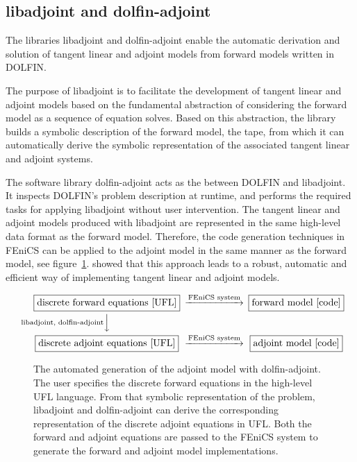\documentclass[prodmode,acmtoms]{acmsmall}
\newcommand{\fenics}{{\mbox{FEniCS}}\xspace}
\newcommand{\dolfin}{{\mbox{DOLFIN}}\xspace}
\newcommand{\da}{\mbox{{dolfin-adjoint}}\xspace}
\newcommand{\libadjoint}{\mbox{{libadjoint}}\xspace}
\begin{document}
\subsection{\libadjoint and \da}
The libraries \libadjoint and \da enable the automatic derivation and solution of tangent linear and adjoint models from forward models written in \dolfin.

The purpose of \libadjoint is to facilitate the development of tangent linear and adjoint models based on the fundamental abstraction of considering the forward model as a sequence of equation solves. 
Based on this abstraction, the library builds a symbolic description of the forward model, the tape, from which it can automatically derive the symbolic representation of the associated tangent linear and adjoint systems. 

The software library \da acts as the between \dolfin and \libadjoint. 
It inspects \dolfin's problem description at runtime, and performs the required tasks for applying \libadjoint without user intervention. 
The tangent linear and adjoint models produced with \libadjoint are represented in the same high-level data format as the forward model. 
Therefore, the code generation techniques in \fenics can be applied to the adjoint model in the same manner as the forward model, see figure~\ref{fig:our_approach}. 
 showed that this approach leads to a robust, automatic and efficient way of implementing tangent linear and adjoint models.  

\begin{figure}
\begin{equation*}
  \begin{CD}
    \fbox{\textrm{discrete forward equations [UFL]}}
    @>\textrm{\fenics system}>>
    \fbox{\textrm{forward model [code]}}\\
    @V\textrm{\libadjoint, \da}VV
    \\
    \fbox{\textrm{discrete adjoint equations [UFL]}}
    @>\textrm{\fenics system}>>
    \fbox{\textrm{adjoint model [code]}}\\
  \end{CD}
\end{equation*}
  \caption{The automated generation of the adjoint model with \da.
    The user specifies the discrete forward equations in the high-level UFL language.
    From that symbolic representation of the problem, \libadjoint and \da can derive the corresponding representation of the discrete adjoint
    equations in UFL. 
    Both the forward and adjoint equations are passed to the \fenics system to generate the forward and adjoint model implementations.}
  \label{fig:our_approach} 
\end{figure}
\end{document}
